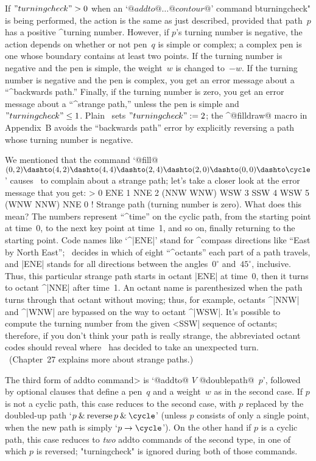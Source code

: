 {{{{\ddanger If $"turningcheck">0$ when an `$@addto@\ldots@contour@$' command
^^"turningcheck" is being performed, the action is the same as just
described, provided that path~$p$ has a positive ^{turning number}.
However, if $p$'s turning number is negative, the action depends on
whether or not pen~$q$ is simple or complex; a complex pen is one whose
boundary contains at least two points. If the turning number is negative
and the pen is simple, the weight~$w$ is changed to~$-w$. If the turning
number is negative and the pen is complex, you get an error message about
a ``^{backwards path}.''  Finally, if the turning number is zero, you get
an error message about a ``^{strange path},'' unless the pen is simple and
$"turningcheck"\le1$.  Plain \MF\ sets $"turningcheck":=2$; the ^@filldraw@
macro in Appendix~B avoids the ``backwards path'' error by explicitly
reversing a path whose turning number is negative.

\danger We mentioned that the command `@fill@ $(0,2)\dashto(4,2)\dashto
(4,4)\dashto(2,4)\dashto(2,0)\dashto(0,0)\dashto\cycle$' causes \MF\
to complain about a strange path; let's take a closer look at the
error message that you get:
\begintt
> 0 ENE 1 NNE 2 (NNW WNW) WSW 3 SSW 4 WSW 5 (WNW NNW) NNE 0
! Strange path (turning number is zero).
\endtt
What does this mean? The numbers represent ``^time'' on the cyclic path,
from the starting point at time~0, to the next key point at time~1,
and so on, finally returning to the starting point. Code names like
`^|ENE|' stand for ^{compass directions} like ``East by North East'';
\MF\ decides in which of eight ``^{octants}'' each part of a path travels,
and |ENE| stands for all directions between the angles~$0^\circ$
and~$45^\circ$, inclusive.  Thus, this particular strange path starts in
octant |ENE| at time~0, then it turns to octant ^|NNE| after time~1.
An octant name is parenthesized when the path turns through that octant
without moving; thus, for example, octants ^|NNW| and ^|WNW| are bypassed
on the way to octant ^|WSW|. It's possible to compute the turning number
from the given ^^|SSW| sequence of octants; therefore, if you don't think
your path is really strange, the abbreviated octant codes should reveal
where \MF\ has decided to take an unexpected turn. \ (Chapter~27 explains
more about strange paths.)

\ddanger The third form of \<addto command> is `@addto@ $V$ @doublepath@~$p$',
followed by optional clauses that define a pen~$q$ and a weight~$w$ as in
the second case. If $p$ is not a cyclic path, this case reduces to the
second case, with $p$ replaced by the doubled-up path
`$p\mathbin{\&}\mathop{\rm reverse}p \mathbin{\&}\cycle$' (unless $p$
consists of only a single point, when the new path is simply
`$p\to\cycle$'\thinspace). On the other hand if $p$ is a cyclic
path, this case reduces to {\sl two\/} addto commands of the second type,
in one of which $p$ is reversed; "turningcheck" is ignored during both of
those commands.

}}}}
